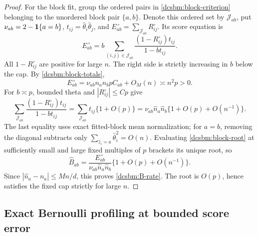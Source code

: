 \begin{proof}
For the block fit, group the ordered pairs in
\cref{dcsbm:block-criterion} belonging to the unordered block pair
\(\{a,b\}\).  Denote this ordered set by \(\mathcal J_{ab}\), put
\(\nu_{ab}=2-\mathbf1\{a=b\}\), \(t_{ij}=\widehat\theta_i\widehat\theta_j\),
and \(E_{ab}^{\,\circ}=\sum_{\mathcal J_{ab}}R^\circ_{ij}\).
Its score equation is
\begin{equation}
 E_{ab}^{\,\circ}
 = b\sum_{(i,j)\in\mathcal J_{ab}}
      \frac{(1-R^\circ_{ij})t_{ij}}{1-bt_{ij}} .
 \label{dcsbm:block-root}
\end{equation}
All \(1-R^\circ_{ij}\) are positive for large \(n\).
The right side is strictly increasing in \(b\) below the cap.
By \cref{dcsbm:block-totals},
\[
 E_{ab}^{\,\circ}
 =\nu_{ab}n_an_bpC_{ab}+O_M(n)\asymp n^2p>0.
\]
For \(b\asymp p\), bounded theta and \(|R^\circ_{ij}|\le Cp\)
give
\[
 \sum_{\mathcal J_{ab}}
   \frac{(1-R^\circ_{ij})t_{ij}}{1-bt_{ij}}
 =\sum_{\mathcal J_{ab}}t_{ij}\{1+O(p)\}
 =\nu_{ab}\widehat n_a\widehat n_b
       \{1+O(p)+O(n^{-1})\}.
\]
The last equality uses exact fitted-block mean normalization;
for \(a=b\), removing the diagonal subtracts only
\(\sum_{\widehat z_i=a}\widehat\theta_i^2=O(n)\).
Evaluating \cref{dcsbm:block-root} at sufficiently small and large
fixed multiples of \(p\) brackets its unique root, so
\[
 \widehat B_{ab}
 =\frac{E_{ab}^{\,\circ}}{\nu_{ab}\widehat n_a\widehat n_b}
       \{1+O(p)+O(n^{-1})\}.
\]
Since \(|\widehat n_a-n_a|\le Mn/d\), this proves
\cref{dcsbm:B-rate}.  The root is \(O(p)\), hence satisfies the
fixed cap strictly for large \(n\).
\end{proof}

\subsection{Exact Bernoulli profiling at bounded score error}

